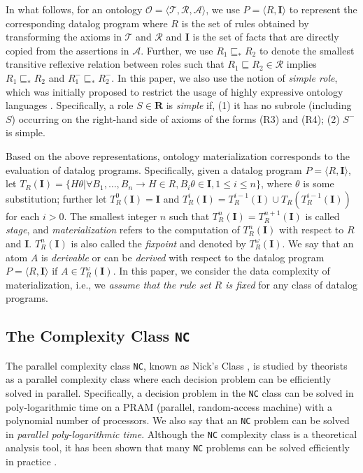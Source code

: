 In what follows, for an ontology $\mathcal{O}=\langle\mathcal{T},\mathcal{R},\mathcal{A}\rangle$,
we use $P=\langle R, \textbf{I}\rangle$ to represent the corresponding datalog program
where $R$ is the set of rules obtained by transforming the axioms in
$\mathcal{T}$ and $\mathcal{R}$ and
$\textbf{I}$ is the set of facts that are directly copied from the assertions in $\mathcal{A}$.
Further, we use $R_1\sqsubseteq_{*}R_2$ to denote the smallest transitive reflexive relation
between roles such that $R_1\sqsubseteq R_2\in\mathcal{R}$ implies $R_1\sqsubseteq_{*}R_2$
and $R_1^-\sqsubseteq_{*}R_2^-$. In this paper, we also use the
notion of \emph{simple role}, which was initially proposed to restrict the
usage of highly expressive ontology languages \cite{HorrocksS04}.
Specifically, a role $S\in\textbf{R}$ is \emph{simple} if, (1) it has no subrole (including $S$)
occurring on the right-hand side of axioms of the forms (R3) and (R4); (2) $S^-$ is simple.

Based on the above representations, ontology materialization
corresponds to the evaluation of datalog programs.
Specifically, given a datalog program $P=\langle R, \textbf{I}\rangle$,
let $T_R(\textbf{I})=\{H\theta|\forall B_1,\ldots,B_n\rightarrow H\in R,
B_i\theta\in\textbf{I}, 1\leq i\leq n \}$,
where $\theta$ is some substitution; further let $T_R^{0}(\textbf{I})=\textbf{I}$ and
 $T_R^{i}(\textbf{I})=T_R^{i-1}(\textbf{I})\cup T_R(T_R^{i-1}(\textbf{I}))$ for each $i>0$.
The smallest integer $n$ such that $T_R^{n}(\textbf{I})= T_R^{n+1}(\textbf{I})$ is called \emph{stage},
and \emph{materialization} refers to the computation of $T_R^{n}(\textbf{I})$ with respect to $R$ and \textbf{I}.
$T_R^{n}(\textbf{I})$ is also called the \emph{fixpoint} and denoted by $T_R^{\omega}(\textbf{I})$.
We say that an atom $A$ is \emph{derivable} or can be \emph{derived} with respect
to the datalog program $P=\langle R, \textbf{I}\rangle$ if $A\in T_R^{\omega}(\textbf{I})$.
In this paper, we consider the data complexity of materialization, i.e., we \emph{assume that the rule set $R$ is fixed}
for any class of datalog programs.


\subsection{The Complexity Class \texttt{NC}}

The parallel complexity class \texttt{NC}, known as Nick's
Class \cite{Raymond95}, is studied by theorists as a parallel complexity class
where each decision problem can be efficiently solved in parallel.
Specifically, a decision problem in the \texttt{NC} class
can be solved in poly-logarithmic time on a PRAM (parallel, random-access machine) with
a polynomial number of processors. We also say that an \texttt{NC} problem can be solved
in \emph{parallel poly-logarithmic time}.
Although the \texttt{NC} complexity class is a theoretical analysis tool,
it has been shown that many \texttt{NC} problems can be solved efficiently in practice \cite{Raymond95}.

